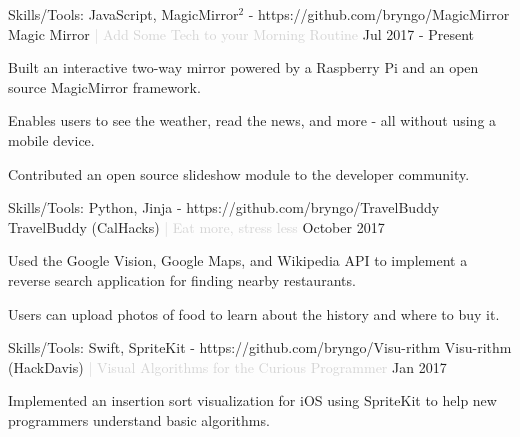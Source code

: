 

\begin{cventries}

  \cventry
  {Skills/Tools: JavaScript, MagicMirror$^2$ - https://github.com/bryngo/MagicMirror} %
  {Magic Mirror \textcolor{lightgray}{| Add Some Tech to your Morning Routine}} %
  {} %
  {Jul 2017 - Present} %
  {
  \begin{cvitems} %
    \item {Built an interactive two-way mirror powered by a Raspberry Pi and an open source MagicMirror framework.}
    \item {Enables users to see the weather, read the news, and more - all without using a mobile device.}
    \item {Contributed an open source slideshow module to the developer community.}
  \end{cvitems}
  }

  \cventry
  {Skills/Tools: Python, Jinja - https://github.com/bryngo/TravelBuddy} %
  {TravelBuddy (CalHacks) \textcolor{lightgray}{| Eat more, stress less}} %
  {} %
  {October 2017} %
  {
  \begin{cvitems} %
    \item {Used the Google Vision, Google Maps, and Wikipedia API to implement a reverse search application for finding nearby restaurants.}
    \item {Users can upload photos of food to learn about the history and where to buy it.}
  \end{cvitems}
  }

  \cventry
  {Skills/Tools: Swift, SpriteKit - https://github.com/bryngo/Visu-rithm} %
  {Visu-rithm (HackDavis) \textcolor{lightgray}{| Visual Algorithms for the Curious Programmer}} %
  {} %
  {Jan 2017} %
  {
  \begin{cvitems} %
    \item {Implemented an insertion sort visualization for iOS using SpriteKit to help new programmers understand basic algorithms.}
  \end{cvitems}
  }

\end{cventries}
